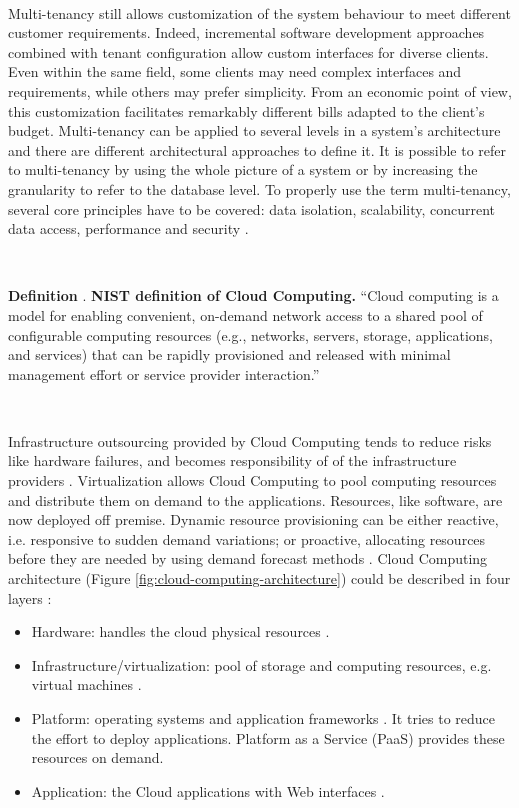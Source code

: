\documentclass[12pt,english]{article} %
\newcounter{definitioncounter}
\newcommand*{\definition}[2]{\textbf{Definition \thedefinitioncounter\refstepcounter{definitioncounter}}.
\textbf{#1}#2}
\begin{document}
\

Multi-tenancy still allows customization of the system behaviour to meet different customer requirements. Indeed, incremental software development approaches combined with tenant configuration allow custom interfaces for diverse clients. 
Even within the same field, some clients may need complex interfaces and requirements, while others may prefer simplicity.
From an economic point of view, this customization facilitates remarkably different bills adapted to the client's budget.
Multi-tenancy can be applied to several levels in a system’s architecture and there are different architectural approaches to define it.
It is possible to refer to multi-tenancy by using the whole picture of a system or by increasing the granularity to refer to the database level.
To properly use the term multi-tenancy, several core principles have to be covered: data isolation, scalability, concurrent data access, performance and security \cite{cloud-computing-state-of-the-art}.

\

\definition{NIST definition of Cloud Computing.}{ ``Cloud computing is a model for enabling convenient, on-demand network access to a shared pool of configurable computing resources (e.g., networks, servers, storage, applications, and services) that can be rapidly provisioned and released with minimal management effort or service provider interaction.'' \cite{cloud-computing-state-of-the-art}}

\

Infrastructure outsourcing provided by Cloud Computing tends to reduce risks like hardware failures, and becomes responsibility of  of the infrastructure providers \cite{cloud-computing-state-of-the-art}.
Virtualization allows Cloud Computing to pool computing resources and distribute them on demand to the applications.
Resources, like software, are now deployed off premise.
Dynamic resource provisioning can be either reactive, i.e. responsive to sudden demand variations; or proactive, allocating resources before they are needed by using demand forecast methods \cite{cloud-computing-state-of-the-art}.
Cloud Computing architecture (Figure \ref{fig:cloud-computing-architecture}) could be described in four layers \cite{cloud-computing-state-of-the-art}:

\begin{itemize}
    \item Hardware: handles the cloud physical resources \cite{cloud-computing-state-of-the-art}.
    \item Infrastructure/virtualization: pool of storage and computing resources, e.g. virtual machines \cite{cloud-computing-state-of-the-art}.
    \item Platform: operating systems and application frameworks \cite{cloud-computing-state-of-the-art}.
    It tries to reduce the effort to deploy applications.
    Platform as a Service (PaaS) provides these resources on demand.
    \item Application: the Cloud applications with Web interfaces \cite{cloud-computing-state-of-the-art}.
\end{itemize}
\end{document}
